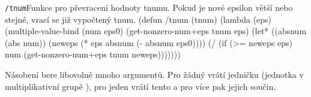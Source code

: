 \begin{lispcode}{\texttt{/tnum}}{Funkce pro převracení hodnoty tnumu. Pokud je nové epsilon větší nebo stejné, vrací se již vypočtený tnum.}
(\textcolor{funkcionalni}{defun} \textcolor{pojmenovan}{/tnum} (tnum)
  (\textcolor{funkcionalni}{lambda} (eps)
    (\textcolor{matematicke}{multiple-value-bind} (num eps0)
        (\textcolor{moje}{get-nonzero-num+eps} tnum eps)
      (\textcolor{vedlejsi}{let*} ((absnum (\textcolor{matematicke}{abs} num))
             (neweps (\textcolor{matematicke}{*} eps absnum (\textcolor{matematicke}{-} absnum eps0))))
        (\textcolor{matematicke}{/} (\textcolor{funkcionalni}{if} (\textcolor{matematicke}{>=} neweps eps) num
             (\textcolor{moje}{get-nonzero-num+eps} tnum neweps)))))))
\end{lispcode}

Násobení bere libovolně mnoho argumentů. Pro žádný vrátí jedničku (jednotka v multiplikativní grupě \cite{RachALG1}), pro jeden vrátí tento a pro více pak jejich součin.

